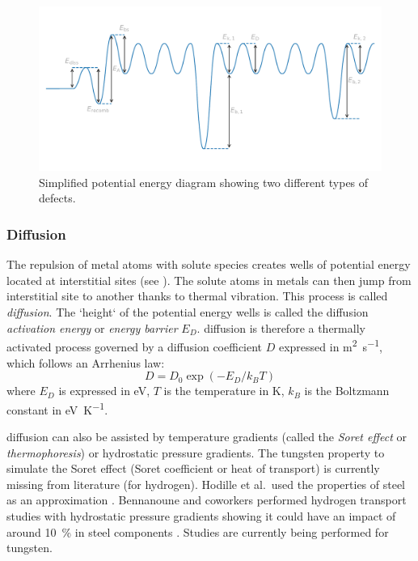 \begin{figure} [h]
    \centering
    \includegraphics[width=\linewidth]{Figures/Chapter1/potential_energy_diagram.pdf}
    \caption{Simplified potential energy diagram showing two different types of defects.}
\end{figure}

\subsubsection{Diffusion}
The repulsion of metal atoms with solute species creates wells of potential energy located at interstitial sites (see ).
The solute atoms in metals can then jump from interstitial site to another thanks to thermal vibration.
This process is called \emph{\gls{diffusion}}.
The `height` of the potential energy wells is called the \gls{diffusion} \textit{activation energy} or \textit{energy barrier} $E_D$.
\Gls{diffusion} is therefore a thermally activated process governed by a diffusion coefficient $D$ expressed in \si{m^2.s^{-1}}, which follows an Arrhenius law:
\begin{equation}
    D = D_0 \exp{(-E_D/k_B T)}
\end{equation}
where $E_D$ is expressed in \si{eV}, $T$ is the temperature in \si{K}, $k_B$ is the Boltzmann constant in \si{eV.K^{-1}}.

\Gls{diffusion} can also be assisted by temperature gradients (called the \emph{\gls{Soret effect}} or \emph{\gls{thermophoresis}})  or hydrostatic pressure gradients.
The tungsten property to simulate the \gls{Soret effect} (Soret coefficient or heat of transport) is currently missing from literature (for hydrogen).
Hodille et al.\ used the properties of steel as an approximation \cite{hodille_estimation_2017}.
Bennanoune and coworkers performed hydrogen transport studies with hydrostatic pressure gradients showing it could have an impact of around \SI{10}{\%} in steel components .
Studies are currently being performed for tungsten.

